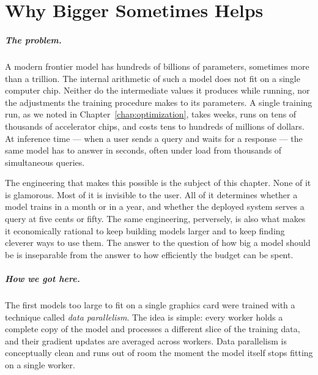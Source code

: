 
\chapter{Why Bigger Sometimes Helps}
\label{chap:efficiency}
\label{ntg:ch7}

\scenelabel
\begin{scenestrip}
\end{scenestrip}

\paragraph{The problem.} A modern frontier model has hundreds of billions of parameters,
sometimes more than a trillion. The internal arithmetic of such
a model does not fit on a single computer chip. Neither do the
intermediate values it produces while running, nor the
adjustments the training procedure makes to its parameters. A
single training run, as we noted in Chapter~\ref{chap:optimization}, takes weeks,
runs on tens of thousands of accelerator chips, and costs tens
to hundreds of millions of dollars. At inference time --- when
a user sends a query and waits for a response --- the same
model has to answer in seconds, often under load from thousands
of simultaneous queries.

The engineering that makes this possible is the subject of this
chapter. None of it is glamorous. Most of it is invisible to
the user. All of it determines whether a model trains in a
month or in a year, and whether the deployed system serves a
query at five cents or fifty. The same engineering, perversely,
is also what makes it economically rational to keep building
models larger and to keep finding cleverer ways to use them.
The answer to the question of how big a model should be is
inseparable from the answer to how efficiently the budget can
be spent.

\paragraph{How we got here.} The first models too large to fit on a single graphics card
were trained with a technique called \emph{data parallelism}.
The idea is simple: every worker holds a complete copy of the
model and processes a different slice of the training data, and
their gradient updates are averaged across workers. Data
parallelism is conceptually clean and runs out of room the
moment the model itself stops fitting on a single worker.

